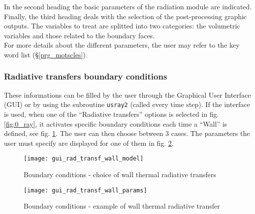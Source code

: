 {{{\noindent
In the second heading the basic parameters of the radiation module are indicated.\\
Finally, the third heading deals with the selection of the
post-processing graphic outputs. The variables to treat are splitted
into two categories: the volumetric variables and those related to the
boundary faces.\\

\noindent
For more details about the different parameters, the user may refer to the
key word list (\S\ref{prg_motscles}).


\subsubsection{Radiative transfers boundary conditions}
These informations can be filled by the user through the Graphical User Interface (GUI) or by using the subroutine \texttt{usray2} (called every time step). If the interface is used, when one of the ``Radiative transfers'' options is selected in fig. \ref{fig:0_ray}, it activates specific boundary conditions each time a ``Wall'' is defined, see fig. \ref{fig:6_ray}. The user can then choose between 3 cases. The parameters the user must specify are displayed for one of them in fig. \ref{fig:7_ray}.
 
\begin{figure}[ht]
\begin{center}
\texttt{[image: gui\_rad\_transf\_wall\_model]}
\caption{Boundary conditions - choice of wall thermal radiative transfers}
\label{fig:6_ray}
\end{center}
\end{figure}

\begin{figure}[ht]
\begin{center}
\texttt{[image: gui\_rad\_transf\_wall\_params]}
\caption{Boundary conditions - example of wall thermal radiative transfer}
\label{fig:7_ray}
\end{center}
\end{figure}

}}}
